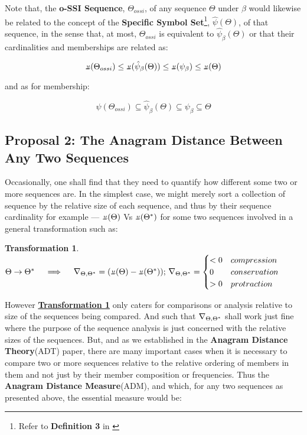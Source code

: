 \documentclass[12pt,a4paper]{article}
\newtheorem{trans}{Transformation}
\newcommand{\invpi}[1]{\mathop{\rotatebox[origin=c]{180}{$\pi$}}#1}
\newcommand{\invdel}[1]{\mathop{\rotatebox[origin=c]{180}{$\Delta$}}#1}
\begin{document}
Note that, the \textbf{o-SSI Sequence}, $\Theta_{ossi}$, of any sequence $\Theta$ under $\beta$ would likewise be related to the concept of the \textbf{Specific Symbol Set}\footnote{Refer to \textbf{Definition 3} in \cite{ossipaper}}, $\hat{\psi}(\Theta)$, of that sequence, in the sense that, at most, $\Theta_{ossi}$ is equivalent to $\hat{\psi}_\beta(\Theta)$  or that their cardinalities and memberships are related as:

\begin{equation}
\invpi(\Theta_{ossi}) \leq  \invpi(\hat{\psi}_\beta(\Theta)) \leq \invpi(\psi_\beta) \leq  \invpi(\Theta)
\end{equation}

and as for membership:


\begin{equation}
\psi(\Theta_{ossi}) \subseteq  \hat{\psi}_\beta(\Theta) \subseteq \psi_\beta \subseteq  \Theta
\end{equation}


\subsection{Proposal 2: The Anagram Distance Between Any Two Sequences\cite{adtpaper}}

Occasionally, one shall find that they need to quantify how different some two or more sequences are. In the simplest case, we might merely sort a collection of sequence by the relative size of each sequence, and thus by their sequence cardinality for example --- $\invpi(\Theta)$ Vs $\invpi(\Theta^*)$ for some two sequences involved in a general transformation such as:\\

\begin{trans}
\label{TRANS1}
$\Theta \rightarrow \Theta^* \quad \implies \quad \invdel_{\Theta,\Theta^*} = (\invpi(\Theta) - \invpi(\Theta^*));\\
\invdel_{\Theta,\Theta^*} = \begin{cases}
< 0 & compression\\
 0 & conservation\\
 > 0 & protraction
 \end{cases}
$
\end{trans}

However \textbf{\hyperref[TRANS1]{Transformation \ref{TRANS1}}} only caters for comparisons or analysis relative to size of the sequences being compared. And such that $\invdel_{\Theta,\Theta^*}$ shall work just fine where the purpose of the sequence analysis is just concerned with the relative sizes of the sequences. But, and as we established in the \textbf{Anagram Distance Theory}(ADT) paper\cite{adtpaper}, there are many important cases when it is necessary to compare two or more sequences relative to the relative ordering of members in them and not just by their member composition or frequencies. Thus the \textbf{Anagram Distance Measure}(ADM), and which, for any two sequences as presented above, the essential measure would be:
\end{document}
